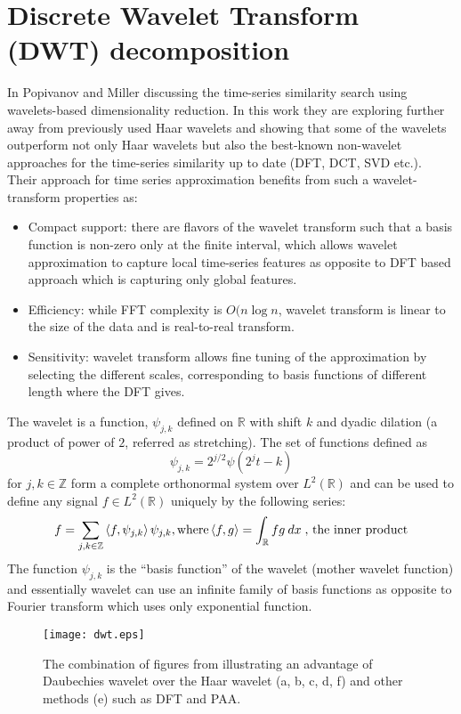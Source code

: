 \section{Discrete Wavelet Transform (DWT) decomposition}
In \cite{citeulike:3734066} Popivanov and Miller discussing the time-series similarity search using wavelets-based dimensionality reduction. In this work they are exploring further away from previously used Haar wavelets \cite{citeulike:4384535} and showing that some of the wavelets outperform not only Haar wavelets but also the best-known non-wavelet approaches for the time-series similarity up to date (DFT, DCT, SVD etc.). Their approach for time series approximation benefits from such a wavelet-transform properties as:
\begin{itemize}
	\item{Compact support: there are flavors of the wavelet transform such that a basis function is non-zero only at the finite interval, which allows wavelet approximation to capture local time-series features as opposite to DFT based approach which is capturing only global features.}
	\item{Efficiency: while FFT complexity is $O(n \log{n}$, wavelet transform is linear to the size of the data and is real-to-real transform.}
	\item{Sensitivity: wavelet transform allows fine tuning of the approximation by selecting the different scales, corresponding to basis functions of different length where the DFT gives.}
\end{itemize}

The wavelet is a function, $\psi_{j,k}$ defined on $\mathbb{R}$ with shift $k$ and dyadic dilation (a product of power of $2$, referred as stretching). The set of functions defined as
\begin{equation}
\psi_{j,k} = 2^{j/2} \psi \left( 2^{j}t - k \right)  
\label{eq:wavelet}
\end{equation} 
for $j, k \in \mathbb{Z}$ form a complete orthonormal system over $L^{2}(\mathbb{R})$ and can be used to define any signal $f \in L^{2}(\mathbb{R})$ uniquely by the following series: 
\begin{equation}
f = \sum_{j, k \in \mathbb{Z}} \left\langle f, \psi_{j,k} \right\rangle  \psi_{j,k}, \\
\text{where} \left\langle f,g \right\rangle = \int_{\mathbb{R}} f g \: dx \; \text{, the inner product}
\label{eq:wavelet_series}
\end{equation} 
The function $\psi_{j,k}$ is the ``basis function'' of the wavelet (mother wavelet function) and essentially wavelet can use an infinite family of basis functions as opposite to Fourier transform which uses only exponential function. 
\begin{figure}[tbp]
   \centering
   \texttt{[image: dwt.eps]}
   \caption{The combination of figures from \cite{citeulike:3734066} illustrating an advantage of Daubechies wavelet over the Haar wavelet (a, b, c, d, f) and other methods (e) such as DFT and PAA.}
   \label{fig:dwt}
\end{figure} 

